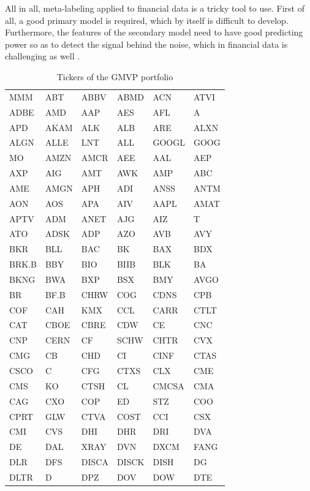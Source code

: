 \documentclass[a4paper]{article}
\begin{document}
All in all, meta-labeling applied to financial data is a tricky tool 
to use. First of all, a good primary model is required, which by 
itself is difficult to develop. Furthermore, the features of the 
secondary model need to have good predicting power so as to detect the 
signal behind the noise, which in financial data is challenging as 
well .

\begin{table}[htbp]
\caption{Tickers of the GMVP portfolio}
\label{table:tickers}
\centering
\begin{tabular}{ |C{2cm}|C{2cm}|C{2cm}|C{2cm}|C{2cm}|C{2cm}|  }
	\hline
	MMM & ABT & ABBV & ABMD & ACN & ATVI\\
	ADBE & AMD & AAP & AES & AFL & A\\
	APD & AKAM & ALK & ALB & ARE & ALXN\\
	ALGN & ALLE & LNT & ALL & GOOGL & GOOG\\
	MO & AMZN & AMCR & AEE & AAL & AEP\\
	AXP & AIG & AMT & AWK & AMP & ABC\\
	AME & AMGN & APH & ADI & ANSS & ANTM\\
	AON & AOS & APA & AIV & AAPL & AMAT\\
	APTV & ADM & ANET & AJG & AIZ & T\\
	ATO & ADSK & ADP & AZO & AVB & AVY\\
	BKR & BLL & BAC & BK & BAX & BDX\\
	BRK.B & BBY & BIO & BIIB & BLK & BA\\
	BKNG & BWA & BXP & BSX & BMY & AVGO\\
	BR & BF.B & CHRW & COG & CDNS & CPB\\
	COF & CAH & KMX & CCL & CARR & CTLT\\
	CAT & CBOE & CBRE & CDW & CE & CNC\\
	CNP & CERN & CF & SCHW & CHTR & CVX\\
	CMG & CB & CHD & CI & CINF & CTAS\\
	CSCO & C & CFG & CTXS & CLX & CME\\
	CMS & KO & CTSH & CL & CMCSA & CMA\\
	CAG & CXO & COP & ED & STZ & COO\\
	CPRT & GLW & CTVA & COST & CCI & CSX\\
	CMI & CVS & DHI & DHR & DRI & DVA\\
	DE & DAL & XRAY & DVN & DXCM & FANG\\
	DLR & DFS & DISCA & DISCK & DISH & DG\\
	DLTR & D & DPZ & DOV & DOW & DTE\\

\end{tabular}
\end{table}
\end{document}
